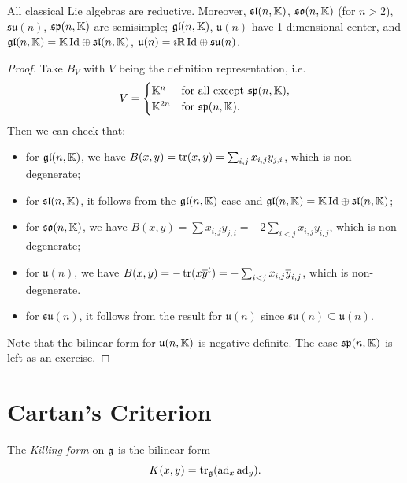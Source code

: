 \begin{theorem}
  All classical Lie algebras are
  reductive. Moreover,
  $\mathfrak{sl}(n, \mathbb{K})$, $\mathfrak{so}(n, \mathbb{K})$ (for $n > 2$),
  $\mathfrak{su}(n)$,
  $\mathfrak{sp}(n, \mathbb{K})$ are semisimple;
  $\mathfrak{gl}(n, \mathbb{K})$, $\mathfrak{u}(n)$
  have 1-dimensional center, and
  $\mathfrak{gl}(n, \mathbb{K}) = {\mathbb{K} \operatorname{Id}} \oplus {\mathfrak{sl}(n, \mathbb{K})}$,
  $\mathfrak{u}(n) = {i \mathbb{R} \operatorname{Id}} \oplus {\mathfrak{su}(n)}$.
\end{theorem}

\begin{proof}
  Take $B_V$ with $V$ being the
  definition representation, i.e.
  \[
    V =
    \begin{cases}
      \mathbb{K}^n & \text{for all except $\mathfrak{sp}(n, \mathbb{K})$}, \\
      \mathbb{K}^{2n} & \text{for $\mathfrak{sp}(n, \mathbb{K})$}.
    \end{cases}
  \]
  Then we can check that:
  \begin{itemize}
    \item for $\mathfrak{gl}(n, \mathbb{K})$, we have
      $B(x, y) = \operatorname{tr}(x, y) = \sum_{i, j} x_{i, j} y_{j, i}$,
      which is non-degenerate;
    \item for $\mathfrak{sl}(n, \mathbb{K})$,
      it follows from the
      $\mathfrak{gl}(n, \mathbb{K})$ case and
      $\mathfrak{gl}(n, \mathbb{K}) = {\mathbb{K} \operatorname{Id}} \oplus {\mathfrak{sl}(n, \mathbb{K})}$;
    \item for $\mathfrak{so}(n, \mathbb{K})$,
      we have $B(x, y) = \sum x_{i, j} y_{j, i} = - 2\sum_{i < j} x_{i, j} y_{i, j}$,
      which is non-degenerate;
    \item for $\mathfrak{u}(n)$, we have
      $B(x, y) = - \operatorname{tr}(x \overline{y}^t) = - \sum_{i < j} x_{i, j} \overline{y}_{i, j}$,
      which is non-degenerate.
    \item for $\mathfrak{su}(n)$, it follows
      from the result for $\mathfrak{u}(n)$
      since $\mathfrak{su}(n) \subseteq \mathfrak{u}(n)$.
  \end{itemize}
  Note that the bilinear form
  for $\mathfrak{u}(n, \mathbb{K})$
  is negative-definite.
  The case $\mathfrak{sp}(n, \mathbb{K})$
  is left as an exercise.
\end{proof}

\section{Cartan's Criterion}

\begin{definition}
  The \emph{Killing form} on $\mathfrak{g}$
  is the bilinear form
  \[
    K(x, y) = \operatorname{tr}_{\mathfrak{g}}(\operatorname{ad}_x \operatorname{ad}_y).
  \]
\end{definition}

